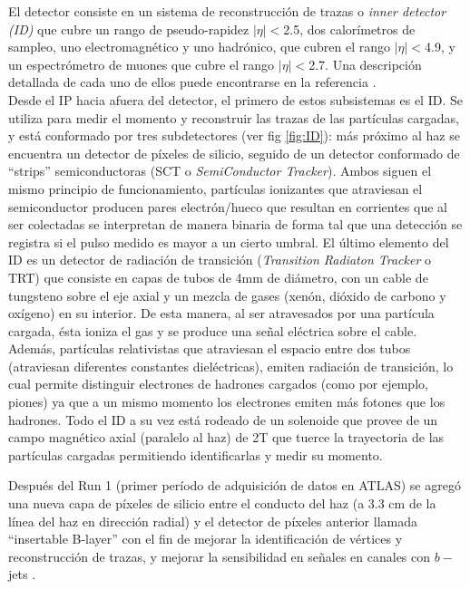 El detector consiste en un sistema de reconstrucción de trazas o \textit{inner detector (ID)} que cubre un rango de pseudo-rapidez $|\eta|<$2.5, dos calorímetros de sampleo, uno electromagnético y uno hadrónico, que cubren el rango $|\eta|<$4.9, y un espectrómetro de muones que cubre el rango $|\eta|<$2.7. Una descripción detallada de cada uno de ellos puede encontrarse en la referencia \cite{ATLAS}.\\

Desde el IP hacia afuera del detector, el primero de estos subsistemas es el ID. Se utiliza para medir el momento y reconstruir las trazas de las partículas cargadas, y está conformado por tres subdetectores (ver fig \ref{fig:ID}): más próximo al haz se encuentra un detector de píxeles de silicio, seguido de un detector conformado de ``strips'' semiconductoras (SCT o \textit{SemiConductor Tracker}). Ambos siguen el mismo principio de funcionamiento, partículas ionizantes que atraviesan el semiconductor producen pares electrón/hueco que resultan en corrientes que al ser colectadas se interpretan de manera binaria de forma tal que una detección se registra si el pulso medido es mayor a un cierto umbral. El último elemento del ID es un detector de radiación de transición (\textit{Transition Radiaton Tracker} o TRT) que consiste en capas de tubos de 4mm de diámetro, con un cable de tungsteno sobre el eje axial y  un mezcla de gases (xenón, dióxido de carbono y oxígeno) en su interior. De esta manera, al ser atravesados por una partícula cargada, ésta ioniza el gas y se produce una señal eléctrica sobre el cable. Además, partículas relativistas que atraviesan el espacio entre dos tubos (atraviesan diferentes constantes dieléctricas), emiten radiación de transición, lo cual permite distinguir electrones de hadrones cargados (como por ejemplo, piones) ya que a un mismo momento los electrones emiten más fotones que los hadrones. 
Todo el ID a su vez está rodeado de un solenoide que provee de un campo magnético axial (paralelo al haz) de 2T que tuerce la trayectoria de las partículas cargadas permitiendo identificarlas y medir su momento.


Después del Run 1 (primer período de adquisición de datos en ATLAS) se agregó una nueva capa de píxeles de silicio entre el conducto del haz (a 3.3 cm de la línea del haz en dirección radial) y el detector de píxeles anterior llamada ``insertable B-layer'' con el fin de mejorar la identificación de vértices y reconstrucción de trazas, y mejorar la sensibilidad en señales en canales con $b-$jets \cite{IBL}.\\

